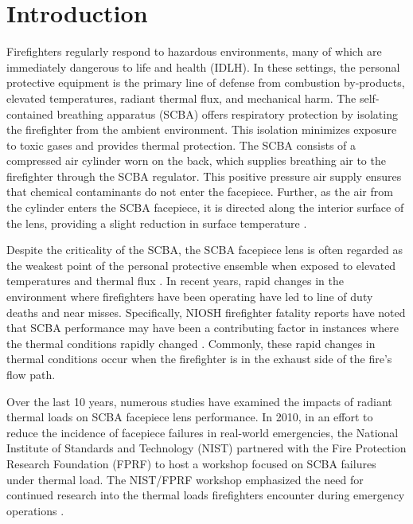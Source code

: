 \documentclass[sn-mathphys]{sn-jnl}%
\theoremstyle{thmstyleone}%
\theoremstyle{thmstyletwo}%
\theoremstyle{thmstylethree}%
\begin{document}
\section{Introduction}\label{sec1}

Firefighters regularly respond to hazardous environments, many of which are immediately dangerous to life and health (IDLH). In these settings, the personal protective equipment is the primary line of defense from combustion by-products, elevated temperatures, radiant thermal flux, and mechanical harm.  The self-contained breathing apparatus (SCBA) offers respiratory protection by isolating the firefighter from the ambient environment. This isolation minimizes exposure to toxic gases and provides thermal protection. The SCBA consists of a compressed air cylinder worn on the back, which supplies breathing air to the firefighter through the SCBA regulator. This positive pressure air supply ensures that chemical contaminants do not enter the facepiece. Further, as the air from the cylinder enters the SCBA facepiece, it is directed along the interior surface of the lens, providing a slight reduction in surface temperature \cite{mensch_fire_2011}.

Despite the criticality of the SCBA, the SCBA facepiece lens is often regarded as the weakest point of the personal protective ensemble when exposed to elevated temperatures and thermal flux \cite{mensch_fire_2011,national_fire_protection_association_nfpa_2012}. In recent years, rapid changes in the environment where firefighters have been operating have led to line of duty deaths and near misses. Specifically, NIOSH firefighter fatality reports have noted that SCBA performance may have been a contributing factor in instances where the thermal conditions rapidly changed \cite{romano_career_2003,berardinelli_career_2007,berardinelli_volunteer_2008,bowyer_career_2008,wertman_volunteer_2009,merinar_career_2010}. Commonly, these rapid changes in thermal conditions occur when the firefighter is in the exhaust side of the fire’s flow path.

Over the last 10 years, numerous studies have examined the impacts of radiant thermal loads on SCBA facepiece lens performance. In 2010, in an effort to reduce the incidence of facepiece failures in real-world emergencies, the National Institute of Standards and Technology (NIST) partnered with the Fire Protection Research Foundation (FPRF) to host a workshop focused on SCBA failures under thermal load. The NIST/FPRF workshop emphasized the need for continued research into the thermal loads firefighters encounter during emergency operations \cite{mensch_emergency_2011}. 
\end{document}
